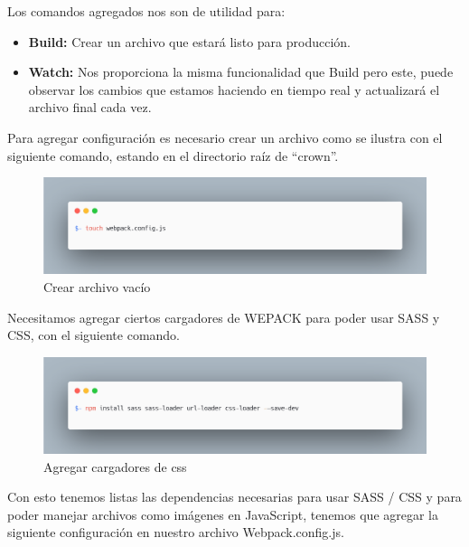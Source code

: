     \newline
    \newline
    Los comandos agregados nos son de utilidad para:
    \begin{itemize}
    \item \textbf{Build:} Crear un archivo que estará listo para producción.
    \item \textbf{Watch:} Nos proporciona la misma funcionalidad que Build pero este, puede observar los cambios que estamos haciendo en tiempo real y actualizará el archivo final cada vez.
    \end{itemize}
    Para agregar configuración es necesario crear un archivo como se ilustra con el siguiente comando, estando en el directorio raíz de “crown”.
    \newline
    \newline
     \begin{figure}[H]
    \includegraphics[width=1\textwidth]{./Imagenes/image38.png}
     \caption[Crear archivo vacío]{Crear archivo vacío}
         \end{figure}
    \newline
    Necesitamos agregar ciertos cargadores de WEPACK para poder usar SASS y CSS, con el siguiente comando.
    \newline
    \newline
     \begin{figure}[H]
    \includegraphics[width=1\textwidth]{./Imagenes/image8.png}
     \caption[Agregar cargadores de css]{Agregar cargadores de css}
         \end{figure}
    \newline
    \newline
    Con esto tenemos listas las dependencias necesarias para usar SASS / CSS y para poder manejar archivos como imágenes en JavaScript, tenemos que agregar la siguiente configuración en nuestro archivo Webpack.config.js.
